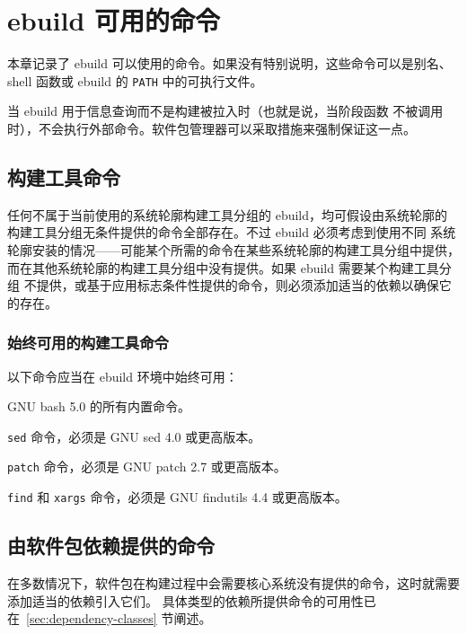 \chapter{ebuild 可用的命令}

本章记录了 ebuild 可以使用的命令。如果没有特别说明，这些命令可以是别名、
shell 函数或 ebuild 的 \texttt{PATH} 中的可执行文件。

当 ebuild 用于信息查询而不是构建被拉入时（也就是说，当阶段函数
不被调用时），不会执行外部命令。软件包管理器可以采取措施来强制保证这一点。

\section{构建工具命令}

任何不属于当前使用的系统轮廓构建工具分组的 ebuild，均可假设由系统轮廓的
构建工具分组无条件提供的命令全部存在。不过 ebuild 必须考虑到使用不同
系统轮廓安装的情况——可能某个所需的命令在某些系统轮廓的构建工具分组中提供，
而在其他系统轮廓的构建工具分组中没有提供。如果 ebuild 需要某个构建工具分组
不提供，或基于应用标志条件性提供的命令，则必须添加适当的依赖以确保它的存在。

\subsection{始终可用的构建工具命令}
\label{sec:guaranteed-system-commands}

以下命令应当在 ebuild 环境中始终可用：
\begin{compactitem}
\item GNU bash 5.0 的所有内置命令。
\item \texttt{sed} 命令，必须是 GNU sed 4.0 或更高版本。
\item \texttt{patch} 命令，必须是 GNU patch 2.7 或更高版本。
\item \texttt{find} 和 \texttt{xargs} 命令，必须是 GNU findutils 4.4 或更高版本。
\end{compactitem}

\section{由软件包依赖提供的命令}

在多数情况下，软件包在构建过程中会需要核心系统没有提供的命令，这时就需要添加适当的依赖引入它们。
具体类型的依赖所提供命令的可用性已在~\ref{sec:dependency-classes} 节阐述。




